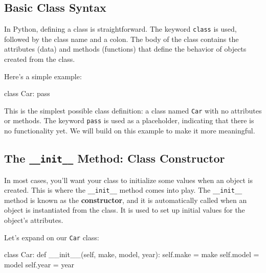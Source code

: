 \documentclass[
  letterpaper,
  DIV=11,
  numbers=noendperiod]{scrreprt}
\newenvironment{Shaded}{\begin{snugshade}}{\end{snugshade}}
\newcommand{\ControlFlowTok}[1]{\textcolor[rgb]{0.00,0.23,0.31}{#1}}
\newcommand{\FunctionTok}[1]{\textcolor[rgb]{0.28,0.35,0.67}{#1}}
\newcommand{\KeywordTok}[1]{\textcolor[rgb]{0.00,0.23,0.31}{#1}}
\newcommand{\NormalTok}[1]{\textcolor[rgb]{0.00,0.23,0.31}{#1}}
\newcommand{\OperatorTok}[1]{\textcolor[rgb]{0.37,0.37,0.37}{#1}}
\newcommand{\VariableTok}[1]{\textcolor[rgb]{0.07,0.07,0.07}{#1}}
\begin{document}
\hypertarget{basic-class-syntax}{%
\subsection{Basic Class Syntax}\label{basic-class-syntax}}

In Python, defining a class is straightforward. The keyword
\texttt{class} is used, followed by the class name and a colon. The body
of the class contains the attributes (data) and methods (functions) that
define the behavior of objects created from the class.

Here's a simple example:

\begin{Shaded}
\begin{Highlighting}[]
\KeywordTok{class}\NormalTok{ Car:}
    \ControlFlowTok{pass}
\end{Highlighting}
\end{Shaded}

This is the simplest possible class definition: a class named
\texttt{Car} with no attributes or methods. The keyword \texttt{pass} is
used as a placeholder, indicating that there is no functionality yet. We
will build on this example to make it more meaningful.

\hypertarget{the-__init__-method-class-constructor}{%
\subsection{\texorpdfstring{The \texttt{\_\_init\_\_} Method: Class
Constructor}{The \_\_init\_\_ Method: Class Constructor}}\label{the-__init__-method-class-constructor}}

In most cases, you'll want your class to initialize some values when an
object is created. This is where the \texttt{\_\_init\_\_} method comes
into play. The \texttt{\_\_init\_\_} method is known as the
\textbf{constructor}, and it is automatically called when an object is
instantiated from the class. It is used to set up initial values for the
object's attributes.

Let's expand on our \texttt{Car} class:

\begin{Shaded}
\begin{Highlighting}[]
\KeywordTok{class}\NormalTok{ Car:}
    \KeywordTok{def} \FunctionTok{\_\_init\_\_}\NormalTok{(}\VariableTok{self}\NormalTok{, make, model, year):}
        \VariableTok{self}\NormalTok{.make }\OperatorTok{=}\NormalTok{ make}
        \VariableTok{self}\NormalTok{.model }\OperatorTok{=}\NormalTok{ model}
        \VariableTok{self}\NormalTok{.year }\OperatorTok{=}\NormalTok{ year}
\end{Highlighting}
\end{Shaded}
\end{document}
